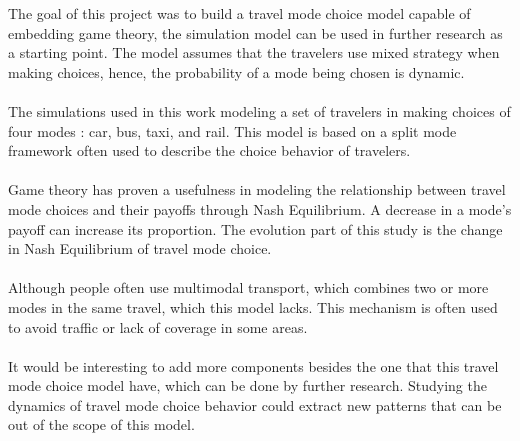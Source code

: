 The goal of this project was to build a travel mode choice model capable of embedding game theory, the simulation model can be used in further research as a starting point. The model assumes that the travelers use mixed strategy when making choices, hence, the probability of a mode being chosen is dynamic. 
\paragraph{}
The simulations used in this work modeling a set of travelers in making choices of four modes : car, bus, taxi, and rail. This model is based on a split mode framework often used to describe the choice behavior of travelers.
\paragraph{}
Game theory has proven a usefulness in modeling the relationship between travel mode choices and their payoffs through Nash Equilibrium. A decrease in a mode's payoff can increase its proportion. The evolution part of this study is the change in Nash Equilibrium of travel mode choice.
\paragraph{}
Although people often use multimodal transport, which combines two or more modes in the same travel, which this model lacks. This mechanism is often used to avoid traffic or lack of coverage in some areas.
\paragraph{}It would be interesting to add more components besides the one that this travel mode choice model have, which can be done by further research. Studying the dynamics of travel mode choice behavior could extract new patterns that can be out of the scope of this model.